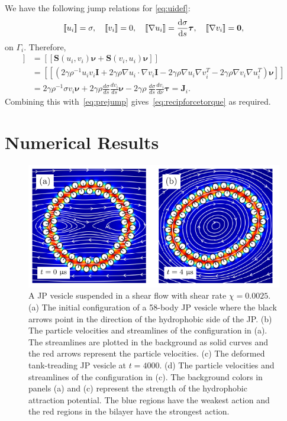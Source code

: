 \documentclass[lineno]{jfm}
\newcommand{\JJ}{\mathbf{J}}
\newcommand{\nnu}{\boldsymbol{\nu}}
\newcommand{\ttau}{\boldsymbol{\tau}}
\newcommand{\jump}[1]{[\![ #1 ]\!]}
\begin{document}
We have the following jump relations for \eqref{eq:uidef}: 
\begin{equation}
\label{eq:DLjump}
\jump{u_i} = \sigma, \quad
\jump{v_i} = 0, \quad
\jump{\nabla u_i} = \frac{\dif \sigma}{\dif s}\ttau,\quad
\jump{\nabla v_i} = \mathbf{0},
\end{equation}
on $\Gamma_i$. Therefore,
\begin{align*}
  \jump{{\bf T}_2\nnu}   &= \jump{\mathbf{S}(u_i,v_i)\nnu  +\mathbf{S}(v_i,u_i)\nnu} \\
  &= \jump{( 2\gamma\rho^{-1} u_i v_i \mathbf{I} + 2\gamma\rho \nabla u_i \cdot \nabla v_i \mathbf{I} 
- 2\gamma\rho \nabla u_i  \nabla v_i^T - 2\gamma\rho \nabla v_i \nabla u_i^T)  \nnu}\\
&= 2\gamma\rho^{-1} \sigma v_i \nnu + 2\gamma\rho \frac{d\sigma }{ds}\frac{dv_i }{ds} \nnu
- 2\gamma\rho \ \frac{d\sigma }{ds} \frac{dv_i }{d\nu} \ttau = \JJ_i.
\end{align*}
Combining this with~\eqref{eq:prejump} gives~\eqref{eq:recipforcetorque}
as required. 



\section{\label{results}Numerical Results}

\begin{figure}
\centering
\includegraphics[width=11.5cm]{Figure3_Wrapper.pdf}
  \caption{\label{figure3} A JP vesicle suspended in a shear flow with
  shear rate $\chi=0.0025$. (a) The initial configuration of a 58-body
  JP vesicle where the black arrows point in the direction of the
  hydrophobic side of the JP. (b) The particle velocities and
  streamlines of the configuration in (a). The streamlines are plotted
  in the background as solid curves and the red arrows represent the
  particle velocities. (c) The deformed tank-treading JP vesicle at
  $t=4000$. (d) The particle velocities and streamlines of the
  configuration in (c). The background colors in panels (a) and (c)
  represent the strength of the hydrophobic attraction potential. The
  blue regions have the weakest action and the red regions in the
  bilayer have the strongest action.}
\end{figure}
\end{document}
